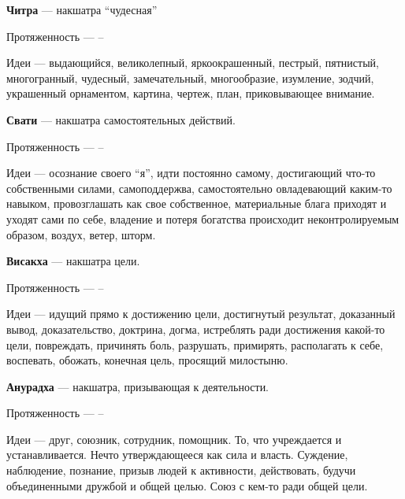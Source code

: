 \begin{myenum}
\begin{mydescr}
		\end{mydescr}
	\item \textbf{Читра} --- накшатра ``чудесная''
		\begin{mydescr}
			\item[Протяженность] ---  -- 
			\item[Идеи] --- выдающийся, великолепный, яркоокрашенный, пестрый, пятнистый, многогранный, чудесный, замечательный, многообразие, изумление, зодчий, украшенный орнаментом, картина, чертеж, план, приковывающее внимание.
		\end{mydescr}
	\item \textbf{Свати} --- накшатра самостоятельных действий.
		\begin{mydescr}
			\item[Протяженность] ---  -- \signum{20}{}{\libra}
			\item[Идеи] --- осознание своего ``я'', идти постоянно самому, достигающий что-то собственными силами, самоподдержва, самостоятельно овладевающий каким-то навыком, провозглашать как свое собственное, материальные блага приходят и уходят сами по себе, владение и потеря богатства происходит неконтролируемым образом, воздух, ветер, шторм.
		\end{mydescr}
	\item \textbf{Висакха} --- накшатра цели.
		\begin{mydescr}
			\item[Протяженность] ---  -- \signum{3}{20}{\scorpio}
			\item[Идеи] --- идущий прямо к достижению цели, достигнутый результат, доказанный вывод, доказательство, доктрина, догма, истреблять ради достижения какой-то цели, повреждать, причинять боль, разрушать, примирять, располагать к себе, воспевать, обожать, конечная цель, просящий милостыню.
		\end{mydescr}
	\item \textbf{Анурадха} --- накшатра, призывающая к деятельности.
		\begin{mydescr}
			\item[Протяженность] ---  -- \signum{16}{40}{\scorpio}
			\item[Идеи] --- друг, союзник, сотрудник, помощник. То, что учреждается и устанавливается. Нечто утверждающееся как сила и власть. Суждение, наблюдение, познание, призыв людей к активности, действовать, будучи объединенными дружбой и общей целью. Союз с кем-то ради общей цели.

\end{mydescr}
\end{myenum}
